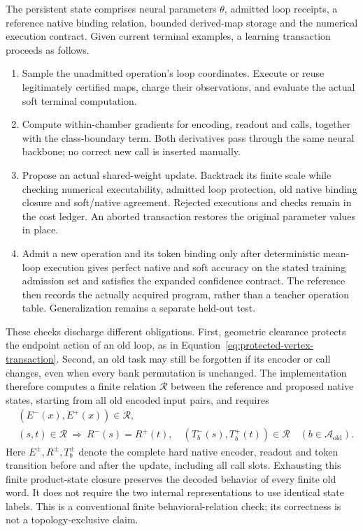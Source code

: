 The persistent state comprises neural parameters $\theta$, admitted loop
receipts, a reference native binding relation, bounded derived-map storage
and the numerical execution contract. Given current terminal examples, a
learning transaction proceeds as follows.
\begin{enumerate}
 \item Sample the unadmitted operation's loop coordinates. Execute or reuse
       legitimately certified maps, charge their observations, and evaluate
       the actual soft terminal computation.
 \item Compute within-chamber gradients for encoding, readout and calls,
       together with the class-boundary term. Both derivatives pass through
       the same neural backbone; no correct new call is inserted manually.
 \item Propose an actual shared-weight update. Backtrack its finite scale
       while checking numerical executability, admitted loop protection,
       old native binding closure and soft/native agreement. Rejected
       executions and checks remain in the cost ledger. An aborted
       transaction restores the original parameter values in place.
 \item Admit a new operation and its token binding only after deterministic
       mean-loop execution gives perfect native and soft accuracy on the
       stated training admission set and satisfies the expanded confidence
       contract. The reference then records the actually acquired program,
       rather than a teacher operation table. Generalization remains a
       separate held-out test.
\end{enumerate}

These checks discharge different obligations. First, geometric clearance
protects the endpoint action of an old loop, as in
Equation~\eqref{eq:protected-vertex-transaction}. Second, an old task may
still be forgotten if its encoder or call changes, even when every bank
permutation is unchanged. The implementation therefore computes a finite
relation $\mathcal R$ between the reference and proposed native states,
starting from all old encoded input pairs, and requires
\begin{equation}
 \begin{split}
 &(E^-(x),E^+(x))\in\mathcal R,\\
 &(s,t)\in\mathcal R\ \Longrightarrow\
   R^-(s)=R^+(t),\quad
   (T_b^-(s),T_b^+(t))\in\mathcal R\quad(b\in\mathcal A_{\mathrm{old}}).
 \end{split}
 \label{eq:block-binding-closure}
\end{equation}
Here $E^\pm,R^\pm,T_b^\pm$ denote the complete hard native encoder,
readout and token transition before and after the update, including all call
slots. Exhausting this finite product-state closure preserves the decoded
behavior of every finite old word. It does not require the two internal
representations to use identical state labels. This is a conventional finite
behavioral-relation check; its correctness is not a topology-exclusive claim.

